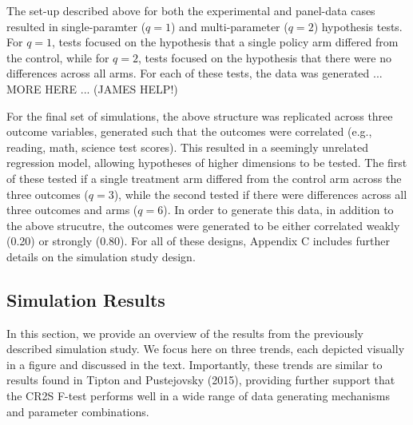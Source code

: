 \documentclass[12pt]{article}\usepackage[]{graphicx}\usepackage[]{color}
\begin{document}
The set-up described above for both the experimental and panel-data cases resulted in single-paramter ($q = 1$) and multi-parameter ($q = 2$) hypothesis tests.
For $q = 1$, tests focused on the hypothesis that a single policy arm differed from the control, while for $q = 2$, tests focused on the hypothesis that there were no differences across all arms.
For each of these tests, the data was generated ... MORE HERE ...
(JAMES HELP!)

For the final set of simulations, the above structure was replicated across three outcome variables, generated such that the outcomes were correlated (e.g., reading, math, science test scores).
This resulted in a seemingly unrelated regression model, allowing hypotheses of higher dimensions to be tested.
The first of these tested if a single treatment arm differed from the control arm across the three outcomes ($q = 3$), while the second tested if there were differences across all three outcomes and arms ($q = 6$).
In order to generate this data, in addition to the above strucutre, the outcomes were generated to be either correlated weakly (0.20) or strongly (0.80). 
For all of these designs, Appendix C includes further details on the simulation study design.

\subsection{Simulation Results}

In this section, we provide an overview of the results from the previously described simulation study. 
We focus here on three trends, each depicted visually in a figure and discussed in the text.
Importantly, these trends are similar to results found in Tipton and Pustejovsky (2015), providing further support that the CR2S F-test performs well in a wide range of data generating mechanisms and parameter combinations.
\end{document}
